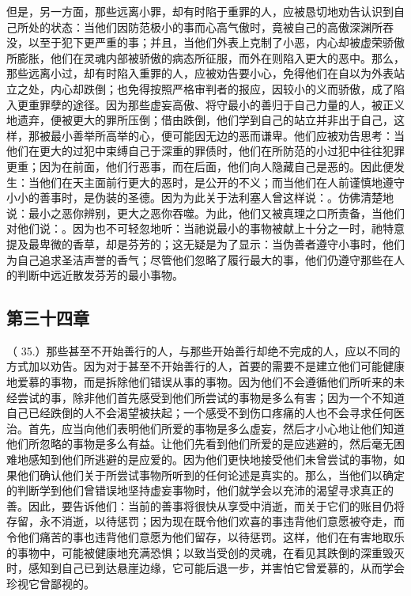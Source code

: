 但是，另一方面，那些远离小罪，却有时陷于重罪的人，应被恳切地劝告认识到自己所处的状态：当他们因防范极小的事而心高气傲时，竟被自己的高傲深渊所吞没，以至于犯下更严重的事；并且，当他们外表上克制了小恶，内心却被虚荣骄傲所膨胀，他们在灵魂内部被骄傲的病态所征服，而外在则陷入更大的恶中。那么，那些远离小过，却有时陷入重罪的人，应被劝告要小心，免得他们在自以为外表站立之处，内心却跌倒；也免得按照严格审判者的报应，因较小的义而骄傲，成了陷入更重罪孽的途径。因为那些虚妄高傲、将守最小的善归于自己力量的人，被正义地遗弃，便被更大的罪所压倒；借由跌倒，他们学到自己的站立并非出于自己，这样，那被最小善举所高举的心，便可能因无边的恶而谦卑。他们应被劝告思考：当他们在更大的过犯中束缚自己于深重的罪债时，他们在所防范的小过犯中往往犯罪更重；因为在前面，他们行恶事，而在后面，他们向人隐藏自己是恶的。因此便发生：当他们在天主面前行更大的恶时，是公开的不义；而当他们在人前谨慎地遵守小小的善事时，是伪装的圣德。因为为此关于法利塞人曾这样说：。仿佛清楚地说：最小之恶你辨别，更大之恶你吞噬。为此，他们又被真理之口所责备，当他们对他们说：。因为也不可轻忽地听：当祂说最小的事物被献上十分之一时，祂特意提及最卑微的香草，却是芬芳的；这无疑是为了显示：当伪善者遵守小事时，他们为自己追求圣洁声誉的香气；尽管他们忽略了履行最大的事，他们仍遵守那些在人的判断中远近散发芬芳的最小事物。\par


\subsection{第三十四章}

\par

（ 35.）那些甚至不开始善行的人，与那些开始善行却绝不完成的人，应以不同的方式加以劝告。因为对于甚至不开始善行的人，首要的需要不是建立他们可能健康地爱慕的事物，而是拆除他们错误从事的事物。因为他们不会遵循他们所听来的未经尝试的事，除非他们首先感受到他们所尝试的事物是多么有害；因为一个不知道自己已经跌倒的人不会渴望被扶起；一个感受不到伤口疼痛的人也不会寻求任何医治。首先，应当向他们表明他们所爱的事物是多么虚妄，然后才小心地让他们知道他们所忽略的事物是多么有益。让他们先看到他们所爱的是应逃避的，然后毫无困难地感知到他们所逃避的是应爱的。因为他们更快地接受他们未曾尝试的事物，如果他们确认他们关于所尝试事物所听到的任何论述是真实的。那么，当他们以确定的判断学到他们曾错误地坚持虚妄事物时，他们就学会以充沛的渴望寻求真正的善。因此，要告诉他们：当前的善事将很快从享受中消逝，而关于它们的账目仍将存留，永不消逝，以待惩罚；因为现在既令他们欢喜的事违背他们意愿被夺走，而令他们痛苦的事也违背他们意愿为他们留存，以待惩罚。这样，他们在有害地取乐的事物中，可能被健康地充满恐惧；以致当受创的灵魂，在看见其跌倒的深重毁灭时，感知到自己已到达悬崖边缘，它可能后退一步，并害怕它曾爱慕的，从而学会珍视它曾鄙视的。\par

